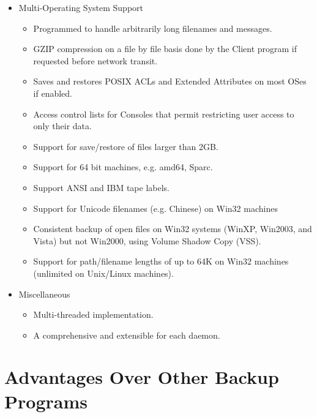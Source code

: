 \begin{itemize}
\item Multi-Operating System Support
   \begin{itemize} 
   \item Programmed to handle arbitrarily long filenames and messages.  
   \item GZIP compression on a file by file basis done by the Client program  if
      requested before network transit.  
    \item Saves and restores POSIX ACLs and Extended Attributes on most OSes if
      enabled.
   \item Access control lists for Consoles that permit restricting user access
      to only their data.  
   \item Support for save/restore of files larger than 2GB.  
   \item Support for 64 bit machines, e.g. amd64, Sparc.
   \item Support ANSI and IBM tape labels.
   \item Support for Unicode filenames (e.g. Chinese) on Win32 machines
   \item Consistent backup of open files on Win32 systems (WinXP, Win2003, 
         and Vista)
         but not Win2000, using Volume Shadow Copy (VSS).
   \item Support for path/filename lengths of up to 64K on Win32 machines
         (unlimited on Unix/Linux machines).
   \end{itemize}

\item Miscellaneous
   \begin{itemize}
   \item Multi-threaded implementation.  
   \item A comprehensive and extensible 
       for each daemon.  
   \end{itemize}
\end{itemize}

\section{Advantages Over Other Backup Programs}

